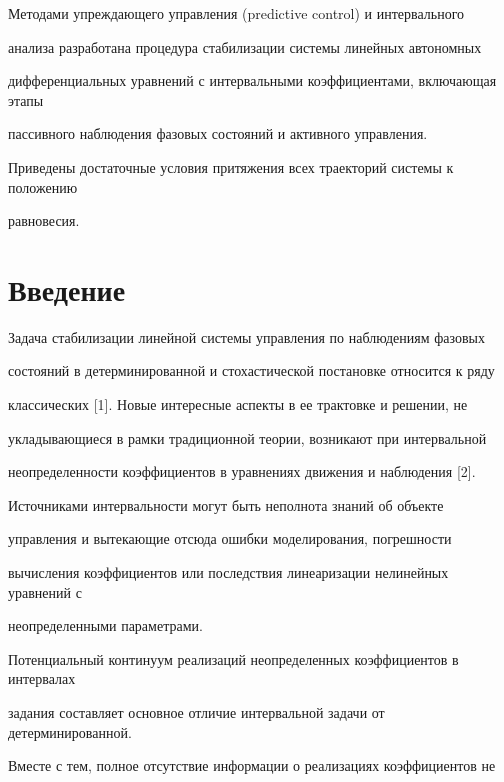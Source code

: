 \label{begin}








Методами упреждающего управления (predictive control) и интервального


анализа разработана процедура стабилизации системы линейных автономных


дифференциальных уравнений с интервальными коэффициентами, включающая этапы


пассивного наблюдения фазовых состояний и активного управления.


Приведены достаточные условия притяжения всех траекторий системы к положению


равновесия.





\section*{Введение}





Задача стабилизации линейной системы управления по наблюдениям фазовых


состояний в детерминированной и стохастической постановке относится к ряду


классических [1]. Новые интересные аспекты в ее трактовке и решении, не


укладывающиеся в рамки традиционной теории, возникают при интервальной


неопределенности коэффициентов в уравнениях движения и наблюдения [2].


Источниками интервальности могут быть неполнота знаний об объекте


управления и вытекающие отсюда ошибки моделирования, погрешности


вычисления коэффициентов или последствия линеаризации нелинейных уравнений с


неопределенными параметрами.





Потенциальный континуум реализаций неопределенных коэффициентов в интервалах


задания составляет основное отличие интервальной задачи от детерминированной.


Вместе с тем, полное отсутствие информации о реализациях коэффициентов не


